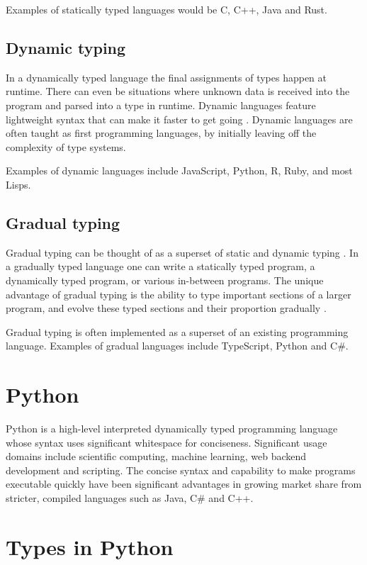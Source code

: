 Examples of statically typed languages would be C, C++, Java and Rust.

\subsection{Dynamic typing}
In a dynamically typed language the final assignments of types happen at runtime. There can even be situations where unknown data is received into the program and parsed into a type in runtime. Dynamic languages feature lightweight syntax that can make it faster to get going \cite{di_grazia_evolution_2022}. Dynamic languages are often taught as first programming languages, by initially leaving off the complexity of type systems.


Examples of dynamic languages include JavaScript, Python, R, Ruby, and most Lisps.

\subsection{Gradual typing}
Gradual typing can be thought of as a superset of static and dynamic typing \cite{siek_refined_gradual_2015}. In a gradually typed language one can write a statically typed program, a dynamically typed program, or various in-between programs. The unique advantage of gradual typing is the ability to type important sections of a larger program, and evolve these typed sections and their proportion gradually \cite{siek_refined_gradual_2015}. 

Gradual typing is often implemented as a superset of an existing programming language. Examples of gradual languages include TypeScript, Python and C\#.


\section{Python}
Python is a high-level interpreted dynamically typed programming language whose syntax uses significant whitespace for conciseness. Significant usage domains include scientific computing, machine learning, web backend development and scripting. The concise syntax and capability to make programs executable quickly have been significant advantages in growing market share from stricter, compiled languages such as Java, C\# and C++.


\section{Types in Python}

